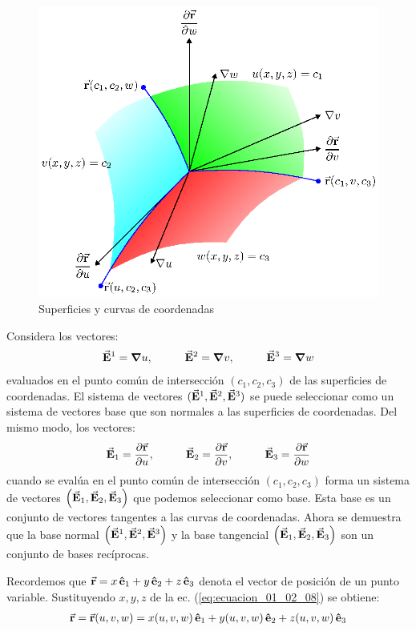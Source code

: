 \documentclass[hidelinks,12pt]{article}
\begin{document}
\begin{figure}[H]
    \centering
    \includegraphics[scale=1.3]{Imagenes/Superficies_Curvas_Coordenadas.eps}
    \caption{Superficies y curvas de coordenadas}
    \label{fig:figura_01_02_01}
\end{figure}

Considera los vectores:
\begin{align}
\va{E}^{1} = \grad{u}, \hspace{1cm} \va{E}^{2} = \grad{v}, \hspace{1cm} \va{E}^{3} = \grad{w}
\label{eq:ecuacion_01_02_12}
\end{align}
evaluados en el punto común de intersección $(c_{1}, c_{2}, c_{3})$ de las superficies de coordenadas. El sistema de vectores $(\va{E}^{1}, \va{E}^{2}, \va{E}^{3})$ se puede seleccionar como un sistema de vectores base que son normales a las superficies de coordenadas. Del mismo modo, los vectores:
\begin{align}
\va{E}_{1} = \pdv{\va{r}}{u}, \hspace{1cm} \va{E}_{2} = \pdv{\va{r}}{v}, \hspace{1cm} \va{E}_{3} = \pdv{\va{r}}{w}
\label{ec:ecuacion_01_02_13}
\end{align}
cuando se evalúa en el punto común de intersección $(c_{1}, c_{2}, c_{3})$ forma un sistema de vectores $\left( \va{E}_{1}, \va{E}_{2}, \va{E}_{3} \right)$ que podemos seleccionar como base. Esta base es un conjunto de vectores tangentes a las curvas de coordenadas. Ahora se demuestra que la base normal $\left( \va{E}^{1}, \va{E}^{2}, \va{E}^{3} \right)$ y la base tangencial $\left( \va{E}_{1}, \va{E}_{2}, \va{E}_{3} \right)$ son un conjunto de bases recíprocas.
\par
Recordemos que $\va{r} = x \, \vu{e}_{1} + y \, \vu{e}_{2} + z \, \vu{e}_{3}$ denota el vector de posición de un punto variable. Sustituyendo $x, y, z$ de la ec. (\ref{eq:ecuacion_01_02_08}) se obtiene:
\begin{align}
\va{r} = \va{r} (u, v, w) = x (u, v, w) \, \vu{e}_{1} + y (u, v, w) \, \vu{e}_{2} + z (u, v, w) \, \vu{e}_{3}
\label{eq:ecuacion_01_02_14}
\end{align}
\end{document}
